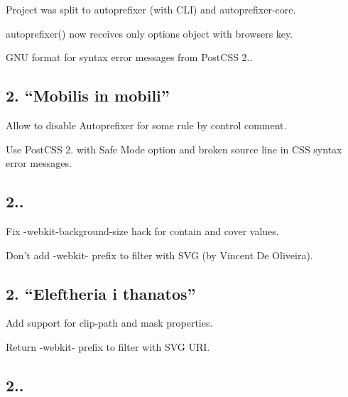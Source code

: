 \begin{DoxyItemize}
\item Project was split to autoprefixer (with C\+LI) and autoprefixer-\/core.
\item {\ttfamily autoprefixer()} now receives only {\ttfamily options} object with {\ttfamily browsers} key.
\item G\+NU format for syntax error messages from Post\+C\+SS 2..
\end{DoxyItemize}

\subsection*{2. “\+Mobilis in mobili”}


\begin{DoxyItemize}
\item Allow to disable Autoprefixer for some rule by control comment.
\item Use Post\+C\+SS 2. with Safe Mode option and broken source line in C\+SS syntax error messages.
\end{DoxyItemize}

\subsection*{2..}


\begin{DoxyItemize}
\item Fix {\ttfamily -\/webkit-\/background-\/size} hack for {\ttfamily contain} and {\ttfamily cover} values.
\item Don’t add {\ttfamily -\/webkit-\/} prefix to {\ttfamily filter} with S\+VG (by Vincent De Oliveira).
\end{DoxyItemize}

\subsection*{2. “\+Eleftheria i thanatos”}


\begin{DoxyItemize}
\item Add support for {\ttfamily clip-\/path} and {\ttfamily mask} properties.
\item Return {\ttfamily -\/webkit-\/} prefix to {\ttfamily filter} with S\+VG U\+RI.
\end{DoxyItemize}

\subsection*{2..}


